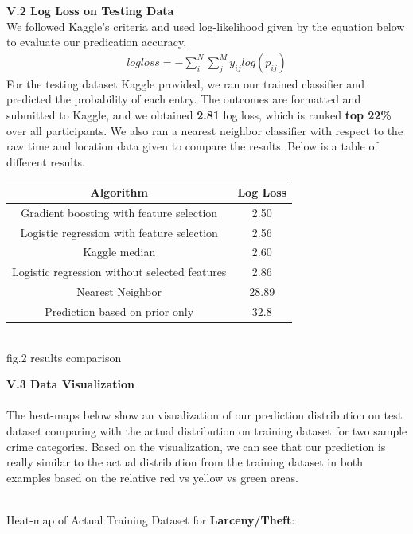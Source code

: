 \documentclass[12pt]{article}
\newenvironment{p4}[2][Part V Results and Evaluation]{\begin{trivlist}
\item[\hskip \labelsep {\bfseries #1}\hskip \labelsep {\bfseries #2}]}{\end{trivlist}}
\begin{document}
\begin{p4}{}
\item{\textbf{V.2 Log Loss on Testing Data}\\}
We followed Kaggle's criteria and used log-likelihood given by the equation below to evaluate our predication accuracy.
\begin{align*}
	logloss = -\sum_i^N \sum_j^M y_{ij} log (p_{ij})
\end{align*}
For the testing dataset Kaggle provided, we ran our trained classifier and predicted the probability of each entry. The outcomes are formatted and submitted to Kaggle, and we obtained \textbf{2.81} log loss, which is ranked \textbf{top 22\%} over all participants. We also ran a nearest neighbor classifier with respect to the raw time and location data given to compare the results. Below is a table of different results.
\begin{center}
	\begin{tabular}{||c c||} 
		\hline
	   	Algorithm & Log Loss \\
		\hline
	   	Gradient boosting with feature selection & 2.50\\
		\hline
		Logistic regression with feature selection & 2.56 \\
		\hline
		Kaggle median & 2.60\\
		\hline
		Logistic regression without selected features& 2.86 \\
		\hline
		Nearest Neighbor & 28.89 \\
		\hline
		Prediction based on prior only & 32.8 \\
		\hline
	\end{tabular}
	{\\fig.2 results comparison}
\end{center}
\item{\textbf{V.3 Data Visualization}\\}
\\ 
The heat-maps below show an visualization of  our prediction distribution on test dataset comparing with the actual distribution on training dataset for two sample crime categories. Based on the visualization, we can see that our prediction is really similar to the actual distribution from the training dataset in both examples based on the relative red vs yellow vs green areas. \\
\\
\newpage
\begin{center}
Heat-map of Actual Training Dataset for \textbf{Larceny/Theft}:\\

\end{center}
\end{p4}
\end{document}
